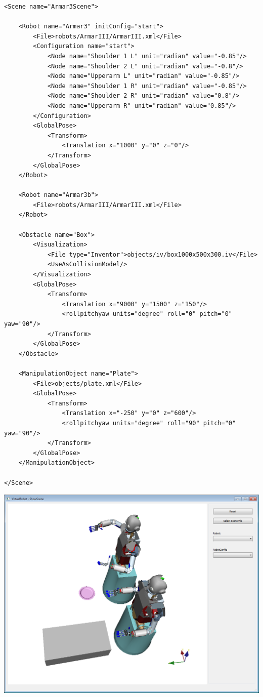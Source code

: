 \par
\begin{lstlisting}
<Scene name="Armar3Scene">

    <Robot name="Armar3" initConfig="start">
        <File>robots/ArmarIII/ArmarIII.xml</File>
        <Configuration name="start">
            <Node name="Shoulder 1 L" unit="radian" value="-0.85"/>
            <Node name="Shoulder 2 L" unit="radian" value="-0.8"/>
            <Node name="Upperarm L" unit="radian" value="-0.85"/>
            <Node name="Shoulder 1 R" unit="radian" value="-0.85"/>
            <Node name="Shoulder 2 R" unit="radian" value="0.8"/>
            <Node name="Upperarm R" unit="radian" value="0.85"/>
        </Configuration>
        <GlobalPose>
            <Transform>
                <Translation x="1000" y="0" z="0"/>
            </Transform>
        </GlobalPose>
    </Robot>

    <Robot name="Armar3b">
        <File>robots/ArmarIII/ArmarIII.xml</File>           
    </Robot>

    <Obstacle name="Box">
        <Visualization>
            <File type="Inventor">objects/iv/box1000x500x300.iv</File>
            <UseAsCollisionModel/>
        </Visualization>
        <GlobalPose>
            <Transform>
                <Translation x="9000" y="1500" z="150"/>
                <rollpitchyaw units="degree" roll="0" pitch="0" yaw="90"/>
            </Transform>
        </GlobalPose>
    </Obstacle>

    <ManipulationObject name="Plate">
        <File>objects/plate.xml</File>    
        <GlobalPose>
            <Transform>
                <Translation x="-250" y="0" z="600"/>
                <rollpitchyaw units="degree" roll="90" pitch="0" yaw="90"/>
            </Transform>
        </GlobalPose>
    </ManipulationObject>

</Scene>
\end{lstlisting}
\par
\includegraphics[width=\textwidth]{Tutorial10}
\par
